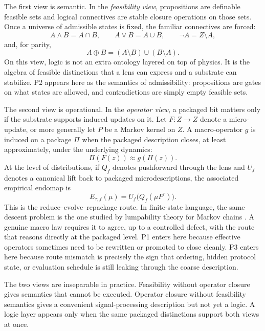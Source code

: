 \documentclass[11pt]{article}
\theoremstyle{definition}
\begin{document}
The first view is semantic. In the \emph{feasibility view}, propositions are definable feasible sets and logical connectives are stable closure operations on those sets. Once a universe of admissible states is fixed, the familiar connectives are forced:
\[
A \wedge B = A \cap B,\qquad
A \vee B = A \cup B,\qquad
\neg A = Z \setminus A,
\]
and, for parity,
\[
A \oplus B = (A \setminus B) \cup (B \setminus A).
\]
On this view, logic is not an extra ontology layered on top of physics. It is the algebra of feasible distinctions that a lens can express and a substrate can stabilize. P2 appears here as the semantics of admissibility: propositions are gates on what states are allowed, and contradictions are simply empty feasible sets.

The second view is operational. In the \emph{operator view}, a packaged bit matters only if the substrate supports induced updates on it. Let \(F : Z \to Z\) denote a micro-update, or more generally let \(P\) be a Markov kernel on \(Z\). A macro-operator \(g\) is induced on a package \(\Pi\) when the packaged description closes, at least approximately, under the underlying dynamics:
\[
\Pi(F(z)) \approx g(\Pi(z)).
\]
At the level of distributions, if \(Q_f\) denotes pushforward through the lens and \(U_f\) denotes a canonical lift back to packaged microdescriptions, the associated empirical endomap is
\[
E_{\tau,f}(\mu) = U_f\!\bigl(Q_f(\mu P^\tau)\bigr).
\]
This is the reduce--evolve--repackage route.
In finite-state language, the same descent problem is the one studied by lumpability theory for Markov chains \cite{buchholz1994lumpability}.
A genuine macro law requires it to agree, up to a controlled defect, with the route that reasons directly at the packaged level. P1 enters here because effective operators sometimes need to be rewritten or promoted to close cleanly. P3 enters here because route mismatch is precisely the sign that ordering, hidden protocol state, or evaluation schedule is still leaking through the coarse description.

The two views are inseparable in practice. Feasibility without operator closure gives semantics that cannot be executed. Operator closure without feasibility semantics gives a convenient signal-processing description but not yet a logic. A logic layer appears only when the same packaged distinctions support both views at once.
\end{document}

